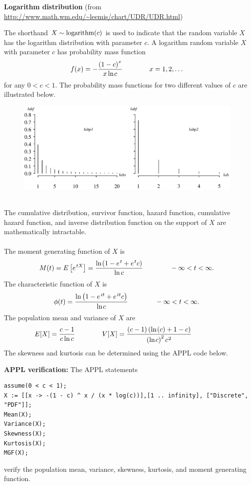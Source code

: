 \documentclass[12pt,fullpage]{article}
\begin{document}
\noindent
{\bf Logarithm distribution} (from \color{blue}\url{http://www.math.wm.edu/~leemis/chart/UDR/UDR.html}\color{black})

\noindent
The shorthand $X \sim {\rm logarithm}(c)$ is used to indicate that the
random variable $X$ has the logarithm distribution with parameter $c$.
A logarithm random variable $X$ with parameter $c$ has probability mass function 
$$
f(x) = -{\frac { \left( 1 - c \right) ^ {x}} {x \ln  \kern -0.08 em c }
} \qquad \qquad x = 1, 2, \ldots
$$
for any $0 < c < 1$.
The probability mass functions for two different values of $c$ are illustrated below.
\begin{figure}[h!]
\begin{center}
\includegraphics[width=5.6in]{LogarithmPlot.ps}
\end{center}
\end{figure}\\
The cumulative distribution, survivor function, hazard function, cumulative hazard 
function, and inverse distribution function on the support of $X$ are mathematically intractable.
\\
\\
The moment generating function of $X$ is
$$
M(t) = E \left[ e ^ {\kern 0.08 em tX} \right] = \frac {\ln  \kern -0.08 em \left( 1 - {e ^ {\kern 0.08 em t}} + {e ^ {\kern 0.08 em t}} c \right) }{\ln  c } \qquad \qquad -\infty < t < \infty.
$$
The characteristic function of $X$ is
$$
\phi(t) = \frac {\ln  \left( 1 - {e ^ {\kern 0.08 em it}} + {e ^ {\kern 0.08 em it}}c \right) }{\ln  \kern -0.08 em c
 } \qquad \qquad -\infty < t < \infty.
$$
The population mean and variance of $X$ are
$$
E[X] = {\frac {c - 1}{c \ln  c}} \qquad \qquad 
V[X] = {\frac { \left( c - 1 \right)  \left(\ln  \kern -0.08 em \left( c \right)+ 1 - c
 \right) }{ \left( \ln \kern -0.08 em c \right) ^ {2}{c} ^ {\kern 0.04 em 2}}} \qquad \qquad 
$$
The skewness and kurtosis can be determined using the APPL code below.
\vspace{0.1in}

\newpage
\noindent
{\bf APPL verification:}
The APPL statements
\begin{verbatim}
assume(0 < c < 1);
X := [[x -> -(1 - c) ^ x / (x * log(c))],[1 .. infinity], ["Discrete", "PDF"]];
Mean(X);
Variance(X);
Skewness(X);
Kurtosis(X);
MGF(X);
\end{verbatim}
verify the population mean, variance, skewness, kurtosis, and moment generating function.
\end{document}
